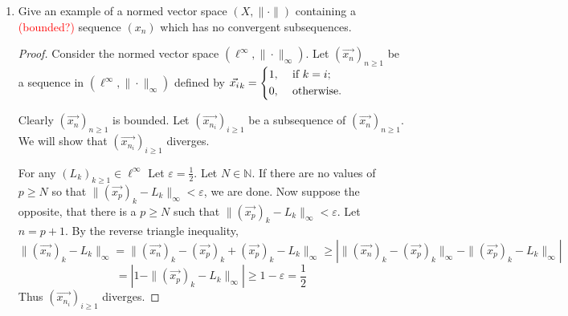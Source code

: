 \documentclass{article}
\theoremstyle{plain} %
\numberwithin{thm}{section} %
\theoremstyle{definition}
\begin{document}
\begin{enumerate}[label=(\alph*)]
\begin{proof}
        \end{proof}
        \item Give an example of a normed vector space $(X,\|\cdot\|)$ containing a \textcolor{red}{(bounded?)} sequence $(x_n)$ which has no convergent subsequences.
        
        \begin{proof}
            Consider the normed vector space \((\ell^{\infty}, \| \cdot \| _\infty)\). Let \((\vec{x_n})_{n\geq1}\) be a sequence in \((\ell^{\infty}, \| \cdot \| _\infty)\) defined by \(\vec{x_i}_k = \begin{dcases}
                1, &\text{ if } k=i ;\\
                0, &\text{ otherwise} .
            \end{dcases}\)

            Clearly \((\vec{x_n})_{n\geq1}\) is bounded. Let \((\vec{x_{n_i}})_{i\geq1}\) be a subsequence of \((\vec{x_n})_{n\geq1}\). We will show that \((\vec{x_{n_i}})_{i\geq1}\) diverges.

            For any \((L_k)_{k\geq1} \in \ell^{\infty}\) Let \(\varepsilon = \frac{1}{2}\). Let \(N \in \mathbb{N}\). If there are no values of \(p \geq N\) so that \(\|(\vec{x_p})_k - L_{k}\| _\infty < \varepsilon\), we are done. Now suppose the opposite, that there is a \(p \geq N\) such that \(\|(\vec{x_{p}})_k - L_{k}\|_\infty < \varepsilon\). Let \(n = p + 1\). By the reverse triangle inequality,
            \[
                \| (\vec{x_n})_k - L_k \|_\infty = \|(\vec{x_n})_k - (\vec{x_{p}})_k + (\vec{x_{p}})_k - L_k \| _\infty \geq \left|\|(\vec{x_n})_k - (\vec{x_{p}})_k \| _\infty - \|(\vec{x_{p}})_k - L_k \| _\infty \right| 
            \]
            \[
                = \left| 1 - \|(\vec{x_{p}})_k - L_k \| _\infty \right| \geq  1 - \varepsilon = \frac{1}{2}
            \]
            Thus \((\vec{x_{n_i}})_{i\geq1}\) diverges.

        \end{proof}
    \end{enumerate}
\end{document}

